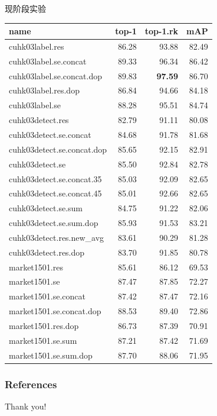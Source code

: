 \documentclass[notes]{beamer}
\newcommand{\chuhao}{\fontsize{44.9pt}{\baselineskip}\selectfont}
\begin{document}
\begin{frame}{现阶段实验}
	\begin{table}
		\begin{tabular}{lrrr}
			\toprule
			{name} &  top-1 &  top-1.rk &    mAP \\
			\midrule
			cuhk03label.res             &  86.28 &     93.88 &  82.49 \\
			cuhk03label.se.concat       &  89.33 &     96.34 &  86.42 \\
			cuhk03label.se.concat.dop   &  89.83 &     \textbf{97.59} &  86.70 \\
			cuhk03label.res.dop         &  86.84 &     94.66 &  84.18 \\
			cuhk03label.se              &  88.28 &     95.51 &  84.74 \\
			cuhk03detect.res            &  82.79 &     91.11 &  80.08 \\
			cuhk03detect.se.concat      &  84.68 &     91.78 &  81.68 \\
			cuhk03detect.se.concat.dop  &  85.65 &     92.15 &  82.91 \\
			cuhk03detect.se             &  85.50 &     92.84 &  82.78 \\
			cuhk03detect.se.concat.35   &  85.03 &     92.09 &  82.65 \\
			cuhk03detect.se.concat.45   &  85.01 &     92.66 &  82.65 \\
			cuhk03detect.se.sum         &  84.75 &     91.22 &  82.06 \\
			cuhk03detect.se.sum.dop     &  85.93 &     91.53 &  83.21 \\
			cuhk03detect.res.new\_avg    &  83.61 &     90.29 &  81.28 \\
			cuhk03detect.res.dop        &  83.70 &     91.85 &  80.78 \\			
			market1501.res              &  85.61 &     86.12 &  69.53 \\
			market1501.se               &  87.47 &     87.85 &  72.27 \\
			market1501.se.concat        &  87.42 &     87.47 &  72.16 \\
			market1501.se.concat.dop    &  88.53 &     89.40 &  72.86 \\
			market1501.res.dop          &  86.73 &     87.39 &  70.91 \\
			market1501.se.sum           &  87.21 &     87.42 &  71.69 \\
			market1501.se.sum.dop       &  87.70 &     88.06 &  71.95 \\
			\bottomrule
			\end{tabular}
	\end{table}
\end{frame}


\begin{frame}[t, allowframebreaks]
\frametitle{References}


\printbibliography
\end{frame}

\begin{frame}
	\chuhao Thank you! %
\end{frame}
\end{document}

